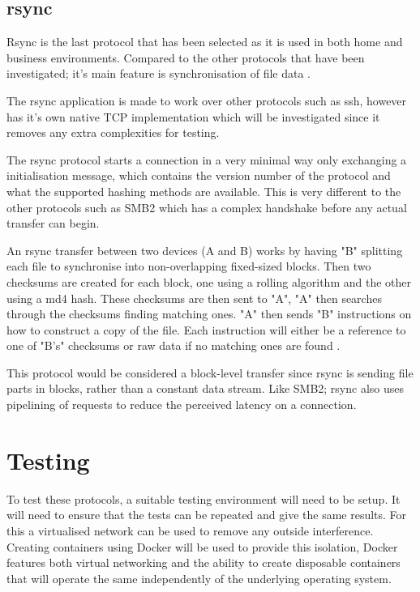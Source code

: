 \subsection*{rsync}
Rsync is the last protocol that has been selected as it is used in both home and business environments. Compared to the other protocols that have been investigated; it's main feature is synchronisation of file data \parencite{rsync-samba}.

The rsync application is made to work over other protocols such as ssh, however has it's own native TCP implementation which will be investigated since it removes any extra complexities for testing.

The rsync protocol starts a connection in a very minimal way only exchanging a initialisation message, which contains the version number of the protocol and what the supported hashing methods are available. This is very different to the other protocols such as SMB2 which has a complex handshake before any actual transfer can begin.

An rsync transfer between two devices (A and B) works by having "B" splitting each file to synchronise into non-overlapping fixed-sized blocks. Then two checksums are created for each block, one using a rolling algorithm and the other using a md4 hash. These checksums are then sent to "A", "A" then searches through the checksums finding matching ones. "A" then sends "B" instructions on how to construct a copy of the file. Each instruction will either be a reference to one of "B's" checksums or raw data if no matching ones are found \parencite{tridgell1996rsync}.


This protocol would be considered a block-level transfer since rsync is sending file parts in blocks, rather than a constant data stream. Like SMB2; rsync also uses pipelining of requests to reduce the perceived latency on a connection.


\section{Testing}
To test these protocols, a suitable testing environment will need to be setup. It will need to ensure that the tests can be repeated and give the same results. For this a virtualised network can be used to remove any outside interference. Creating containers using Docker will be used to provide this isolation, Docker features both virtual networking and the ability to create disposable containers that will operate the same independently of the underlying operating system.

